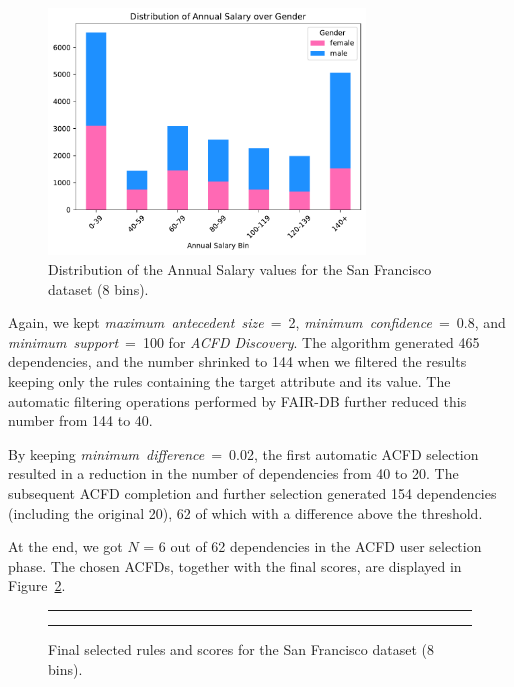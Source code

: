 \begin{itemize}
\begin{figure}[t!]
\centering
\includegraphics[width=0.75\textwidth]{figures/san_francisco_annual_salary_over_gender.pdf}
\caption{Distribution of the \textrm{Annual Salary} values for the San Francisco dataset (8 bins).}
\label{fig:san_francisco_8bins_fair-db1}
\end{figure}

Again, we kept \textit{maximum~antecedent~size}~=~2, \textit{minimum~confidence}~=~0.8, and \textit{minimum~support}~=~100 for \textit{ACFD Discovery}. The algorithm generated 465 dependencies, and the number shrinked to 144 when we filtered the results keeping only the rules containing the target attribute and its value. The automatic filtering operations performed by FAIR-DB further reduced this number from 144 to 40.

By keeping \textit{minimum~difference}~=~0.02, the first automatic ACFD selection resulted in a reduction in the number of dependencies from 40 to 20. The subsequent ACFD completion and further selection generated 154 dependencies (including the original 20), 62 of which with a difference above the threshold.

At the end, we got \(N\) = 6 out of 62 dependencies in the ACFD user selection phase. The chosen ACFDs, together with the final scores, are displayed in Figure~\ref{fig:san_francisco_8bins_fair-db2}.

\begin{figure}[t!]
\centering
\noindent\rule{\linewidth}{0.4pt}\par
\noindent\rule{\linewidth}{0.4pt}
\caption{Final selected rules and scores for the San Francisco dataset (8 bins).}
\label{fig:san_francisco_8bins_fair-db2}
\end{figure}


\end{itemize}
